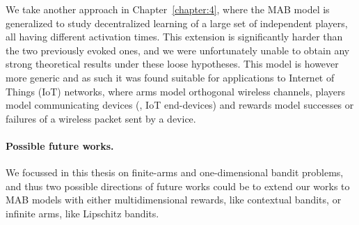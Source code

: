 We take another approach in Chapter~\ref{chapter:4}, where the MAB model is generalized to study decentralized learning of a large set of independent players, all having different activation times.
This extension is significantly harder than the two previously evoked ones, and we were unfortunately unable to obtain any strong theoretical results under these loose hypotheses.
This model is however more generic and as such it was found suitable for applications to Internet of Things (IoT) networks, where arms model orthogonal wireless channels, players model communicating devices (\ie, IoT end-devices) and rewards model successes or failures of a wireless packet sent by a device.


\paragraph{Possible future works.}
%
We focussed in this thesis on finite-arms and one-dimensional bandit problems,
and thus two possible directions of future works could be to extend our works
to MAB models with either multidimensional rewards, like contextual bandits, or infinite arms, like Lipschitz bandits.



